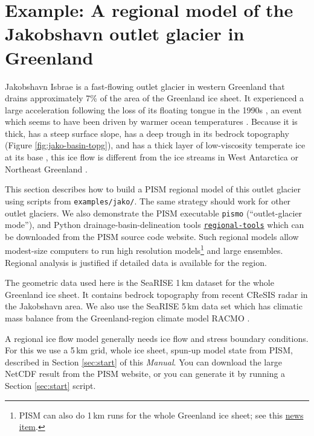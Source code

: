 \section{Example: A regional model of the Jakobshavn outlet glacier in Greenland}\label{sec:jako}  

Jakobshavn Isbrae is a fast-flowing outlet glacier in western Greenland that drains approximately 7\% of the area of the Greenland ice sheet.  It experienced a large acceleration following the loss of its floating tongue in the 1990s \cite{JoughinAbdalatiFahnestock}, an event which seems to have been driven by warmer ocean temperatures \cite{Hollandetal2008}.  Because it is thick, has a steep surface slope, has a deep trough in its bedrock topography (Figure \ref{fig:jako-basin-topg}), and has a thick layer of low-viscosity temperate ice at its base \cite{Luethietal2009}, this ice flow is different from the ice streams in West Antarctica or Northeast Greenland \cite{TrufferEchelmeyer}.
 
This section describes how to build a PISM regional model of this outlet glacier \cite{DellaGiustina2011} using scripts from \texttt{examples/jako/}.  The same strategy should work for other outlet glaciers.  We also demonstrate the PISM executable \texttt{pismo} (``outlet-glacier mode''), and Python drainage-basin-delineation tools \href{https://github.com/pism/regional-tools}{\texttt{regional-tools}} which can be downloaded from the PISM source code website.  Such regional models allow modest-size computers to run high resolution models\footnote{PISM can also do 1\,km runs for the whole Greenland ice sheet; see this \href{http://www.pism-docs.org/wiki/doku.php?id=news:first1km}{news item}.} and large ensembles.  Regional analysis is justified if detailed data is available for the region.

The geometric data used here is the SeaRISE  \cite{Bindschadler2013SeaRISE} 1\,km dataset for the whole Greenland ice sheet.  It contains bedrock topography from recent CReSIS radar in the Jakobshavn area.  We also use the SeaRISE 5\,km data set which has climatic mass balance from the Greenland-region climate model RACMO \cite{Ettemaetal2009}.

A regional ice flow model generally needs ice flow and stress boundary conditions.  For this we use a 5\,km grid, whole ice sheet, spun-up model state from PISM, described in Section \ref{sec:start} of this \emph{Manual}.  You can download the large NetCDF result from the PISM website, or you can generate it by running a Section \ref{sec:start} script. 

